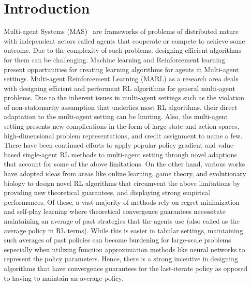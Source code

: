 \chapter{Introduction}

Multi-agent Systems (MAS)~\cite{tuylsMultiagent2012} are frameworks of problems of distributed
nature with independent actors called agents that cooperate or compete to achieve some outcome.
Due to the complexity of such problems, designing efficient algorithms for them can be challenging.
Machine learning and Reinforcement learning present opportunities for creating learning algorithms
for agents in Multi-agent settings.
Multi-agent Reinforcement Learning (MARL) as a research area deals with designing efficient and
performant RL algorithms for general multi-agent problems.
Due to the inherent issues in multi-agent settings such as the violation of non-stationarity
assumption that underlies most RL algorithms, their direct adaptation to the multi-agent setting
can be limiting.
Also, the multi-agent setting presents new complications in the form of large state and action
spaces, high-dimensional problem representations, and credit assignment to name a few.
There have been continued efforts to apply popular policy gradient and value-based single-agent RL
methods to multi-agent setting through novel adaptions that account for some of the above
limitations.
On the other hand, various works have adopted ideas from areas like online learning, game theory,
and evolutionary biology to design novel RL algorithms that circumvent the above limitations by
providing new theoretical guarantees, and displaying strong empirical performances.
Of these, a vast majority of methods rely on regret minimization and self-play learning where
theoretical convergence guarantees necessitate maintaining an average of past strategies that the
agents use (also called as the average policy in RL terms).
While this is easier in tabular settings, maintaining such averages of past policies can become
burdening for large-scale problems especially when utilizing function approximation methods like
neural networks to represent the policy parameters.
Hence, there is a strong incentive in designing algorithms that have convergence guarantees for the
last-iterate policy as opposed to having to maintain an average policy.

